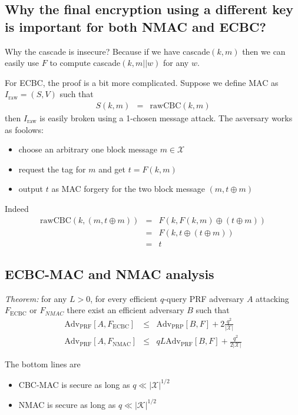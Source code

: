 \documentclass{article}
\begin{document}
\subsection{Why the final encryption  using a different key is important for
  both NMAC and ECBC?}

Why the cascade is insecure? Because if we have cascade$(k, m)$ then we can
easily use $F$ to compute cascade$(k, m||w)$ for any $w$.

For ECBC, the proof is a bit more complicated. Suppose we define MAC as
$I_\text{raw} = (S,V)$ such that
\begin{eqnarray}
  S(k, m) &=& \text{rawCBC}(k, m)
\end{eqnarray}
then $I_\text{raw}$ is easily broken using a 1-chosen message attack. The
asversary works as foolows:
\begin{itemize}
\item choose an arbitrary one block message $m \in \mathcal{X}$
\item request the tag for $m$ and get $t = F(k, m)$
\item output $t$ as MAC forgery for the two block message $(m , t \oplus m)$
\end{itemize}
Indeed
\begin{eqnarray}
  \text{rawCBC} (k, (m, t \oplus m)) &=& F(k, F(k, m) \oplus (t \oplus m)) \\
  &=& F(k, t \oplus (t \oplus m)) \\
  &=& t
\end{eqnarray}

\subsection{ECBC-MAC and NMAC analysis}
\emph{Theorem: } for any $L > 0$, for every efficient $q$-query PRF adversary
$A$ attacking $F_\text{ECBC}$ or $F_{NMAC}$ there exist an efficient adversary
$B$ such that
\begin{eqnarray}
  \text{Adv}_\text{PRF}[A, F_\text{ECBC}] &\le& \text{Adv}_\text{PRP}[B, F] + 2
  \frac{q^2}{|\mathcal{X}|}\\
  \text{Adv}_\text{PRF}[A, F_\text{NMAC}] &\le& q L \text{Adv}_\text{PRF}[B, F]
  + \frac{q^2}{2 |\mathcal{X}|}
\end{eqnarray}

The bottom lines are
\begin{itemize}
\item CBC-MAC is secure as long as $q \ll |\mathcal{X}|^{1/2}$
\item NMAC is secure as long as $q \ll |\mathcal{K}|^{1/2}$
\end{itemize}
\end{document}
